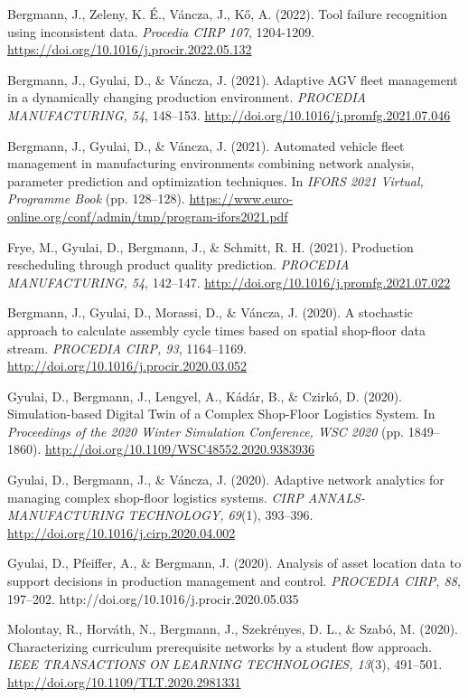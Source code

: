 \documentclass[10pt,a4paper,ragged2e]{altacv}
\begin{document}


\begin{enumerate}[label={[\arabic*]}]
	\item Bergmann, J., Zeleny, K. É., Váncza, J., Kő, A. (2022). Tool failure recognition using inconsistent data. \textit{Procedia CIRP 107}, 1204-1209. \url{https://doi.org/10.1016/j.procir.2022.05.132}
	\item Bergmann, J., Gyulai, D., \& Váncza, J. (2021). Adaptive AGV fleet management in a dynamically changing production environment. \textit{PROCEDIA MANUFACTURING, 54}, 148–153. \url{http://doi.org/10.1016/j.promfg.2021.07.046}
	\item Bergmann, J., Gyulai, D., \& Váncza, J. (2021). Automated vehicle fleet management in manufacturing environments combining network analysis, parameter prediction and optimization techniques. In \textit{IFORS 2021 Virtual, Programme Book} (pp. 128–128). \url{https://www.euro-online.org/conf/admin/tmp/program-ifors2021.pdf}
	\item Frye, M., Gyulai, D., Bergmann, J., \& Schmitt, R. H. (2021). Production rescheduling through product quality prediction. \textit{PROCEDIA MANUFACTURING, 54}, 142–147. \url{http://doi.org/10.1016/j.promfg.2021.07.022}
	\item Bergmann, J., Gyulai, D., Morassi, D., \& Váncza, J. (2020). A stochastic approach to calculate assembly cycle times based on spatial shop-floor data stream. \textit{PROCEDIA CIRP, 93}, 1164–1169. \url{http://doi.org/10.1016/j.procir.2020.03.052}
	\item Gyulai, D., Bergmann, J., Lengyel, A., Kádár, B., \& Czirkó, D. (2020). Simulation-based Digital Twin of a Complex Shop-Floor Logistics System. In \textit{Proceedings of the 2020 Winter Simulation Conference, WSC 2020} (pp. 1849–1860). \url{http://doi.org/10.1109/WSC48552.2020.9383936}
	\item Gyulai, D., Bergmann, J., \& Váncza, J. (2020). Adaptive network analytics for managing complex shop-floor logistics systems. \textit{CIRP ANNALS-MANUFACTURING TECHNOLOGY, 69}(1), 393–396. \url{http://doi.org/10.1016/j.cirp.2020.04.002}
	\item Gyulai, D., Pfeiffer, A., \& Bergmann, J. (2020). Analysis of asset location data to support decisions in production management and control. \textit{PROCEDIA CIRP, 88}, 197–202. http://doi.org/10.1016/j.procir.2020.05.035
	\item Molontay, R., Horváth, N., Bergmann, J., Szekrényes, D. L., \& Szabó, M. (2020). Characterizing curriculum prerequisite networks by a student flow approach. \textit{IEEE TRANSACTIONS ON LEARNING TECHNOLOGIES, 13}(3), 491–501. \url{http://doi.org/10.1109/TLT.2020.2981331}

\end{enumerate}
\end{document}
